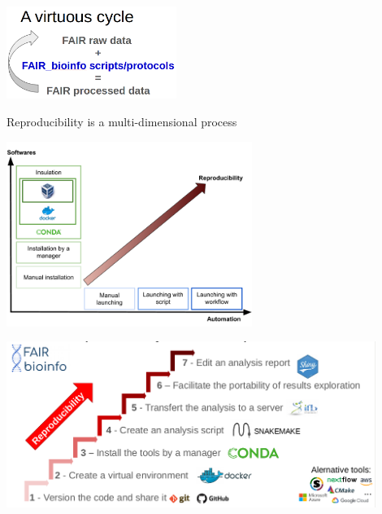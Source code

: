 \begin{frame}{\FAIRB}
\begin{columns}[t]
\begin{column}{.25\textwidth}
\begin{center}
     \end{center}
  \end{column}
\end{columns}
\begin{center}
    \includegraphics[height=3cm]{09_conclusion/images/FAIR_virtuousCircle.png}
\end{center}
\end{frame}

\begin{frame}{\FAIRB}

Reproducibility is a multi-dimensional process

\begin{center}
    \includegraphics[width=8cm]{09_conclusion/images/FAIR_2d_reproducibility.png}
\end{center}

\end{frame}

\begin{frame}{\FAIRB}

\begin{center}
    \includegraphics[width=12cm]{09_conclusion/images/FAIR_7steps_reproducibility.png}
\end{center}

\end{frame}

